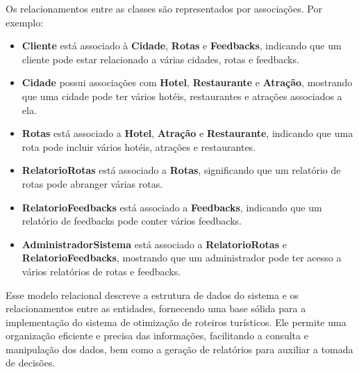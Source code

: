 Os relacionamentos entre as classes são representados por associações. Por exemplo:
\begin{itemize}
    \item \textbf{Cliente} está associado à \textbf{Cidade}, \textbf{Rotas} e \textbf{Feedbacks}, indicando que um cliente pode estar relacionado a várias cidades, rotas e feedbacks.
    \item \textbf{Cidade} possui associações com \textbf{Hotel}, \textbf{Restaurante} e \textbf{Atração}, mostrando que uma cidade pode ter vários hotéis, restaurantes e atrações associados a ela.
    \item \textbf{Rotas} está associado a \textbf{Hotel}, \textbf{Atração} e \textbf{Restaurante}, indicando que uma rota pode incluir vários hotéis, atrações e restaurantes.
    \item \textbf{RelatorioRotas} está associado a \textbf{Rotas}, significando que um relatório de rotas pode abranger várias rotas.
    \item \textbf{RelatorioFeedbacks} está associado a \textbf{Feedbacks}, indicando que um relatório de feedbacks pode conter vários feedbacks.
    \item \textbf{AdministradorSistema} está associado a \textbf{RelatorioRotas} e \textbf{RelatorioFeedbacks}, mostrando que um administrador pode ter acesso a vários relatórios de rotas e feedbacks.
\end{itemize}

Esse modelo relacional descreve a estrutura de dados do sistema e os relacionamentos entre as entidades, fornecendo uma base sólida para a implementação do sistema de otimização de roteiros turísticos. Ele permite uma organização eficiente e precisa das informações, facilitando a consulta e manipulação dos dados, bem como a geração de relatórios para auxiliar a tomada de decisões.

